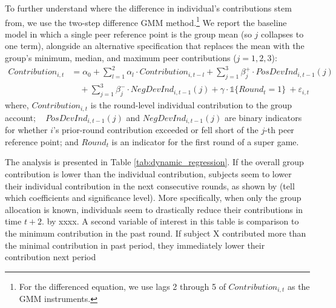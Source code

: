 \documentclass[12pt,letterpaper,english]{article}
\begin{document}
To further understand where the difference in individual's contributions stem from, we use the \cite{ArellanoBond1991} two-step difference GMM method.\footnote{For the differenced equation\label{eq:dynamic_reg}, we use lags 2 through 5 of $Contribution_{i,t}$ as the GMM instruments.}
We report the baseline model in which a single peer reference point is the group mean (so $j$ collapses to one term), alongside an alternative specification that replaces the mean with the
group's minimum, median, and maximum peer contributions ($j=1,2,3$):  
\begin{equation}
\begin{split}
     Contribution_{i,t}
    &=\alpha_0+ \sum_{l=1}^{2} \alpha_l \cdot Contribution_{i,t-l} + \sum_{j=1}^{3} \beta^{+}_{j} \cdot PosDevInd_{i,t-1}(j)   \\
    &\quad + \sum_{j=1}^{3} \beta^{-}_{j} \cdot NegDevInd_{i,t-1}(j) + \gamma \cdot \mathds{1}\{Round_{t} =1\} \ + \varepsilon_{i,t}
\end{split}
\label{eq:dynamic_reg}
\end{equation}
where,
$Contribution_{i,t}$ is the round-level individual contribution to the group account; \,\,\, $PosDevInd_{i,t-1}(j)$ and $NegDevInd_{i,t-1}(j)$ are binary indicators for whether $i$'s prior-round contribution exceeded or fell short of the $j$-th peer reference point; and 
$Round_t$ is an indicator
for the first round of a super game. 

 The analysis is presented in Table \ref{tab:dynamic_regression}. If the overall group contribution is lower than the individual contribution, subjects seem to lower their individual contribution in the next consecutive rounds, as shown by (tell which coefficients and significance level). More specifically, when only the group allocation is known, individuals seem to drastically reduce their contributions in time $t+2$. by xxxx. A second variable of interest in this table is comparison to the minimum contribution in the past round. If subject X contributed more than the minimal contribution in past period, they immediately lower their contribution next period %

\begin{table}[htbp]
    \centering \footnotesize
    
    \caption{Dynamic Panel Regression Analysis. Columns span the two treatments crossed with two definitions of the deviation regressors: the group-mean deviation (columns 1--2) and the per-peer min/median/max deviations (columns 3--4). Arellano-Bond two-step GMM with Windmeijer-corrected robust standard errors in parentheses. Instruments: lags 2--5 of contribution.}
    \label{tab:dynamic_regression}
\end{table}
\end{document}
